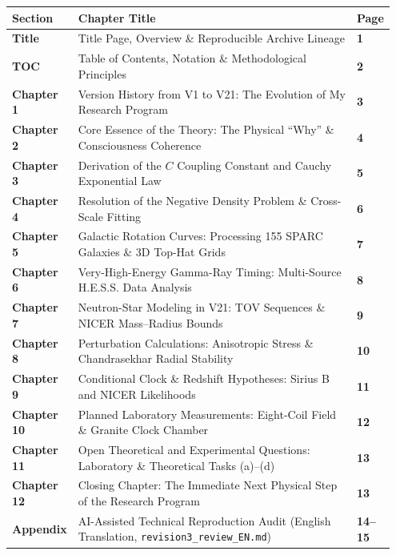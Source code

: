\documentclass[10pt,a4paper]{article}
\begin{document}
\par\vspace{1pt}
{\footnotesize
\begin{tabular}{@{}>{\raggedright\arraybackslash\bfseries\leavevmode\color{navy}}p{0.12\linewidth}>{\raggedright\arraybackslash}p{0.75\linewidth}>{\raggedleft\arraybackslash\bfseries}p{0.08\linewidth}@{}}
\toprule
Section & Chapter Title & Page \\
\midrule
Title & Title Page, Overview \& Reproducible Archive Lineage & 1 \\
TOC & Table of Contents, Notation \& Methodological Principles & 2 \\
Chapter 1 & Version History from V1 to V21: The Evolution of My Research Program & 3 \\
Chapter 2 & Core Essence of the Theory: The Physical ``Why'' \& Consciousness Coherence & 4 \\
Chapter 3 & Derivation of the $C$ Coupling Constant and Cauchy Exponential Law & 5 \\
Chapter 4 & Resolution of the Negative Density Problem \& Cross-Scale Fitting & 6 \\
Chapter 5 & Galactic Rotation Curves: Processing 155 SPARC Galaxies \& 3D Top-Hat Grids & 7 \\
Chapter 6 & Very-High-Energy Gamma-Ray Timing: Multi-Source H.E.S.S. Data Analysis & 8 \\
Chapter 7 & Neutron-Star Modeling in V21: TOV Sequences \& NICER Mass--Radius Bounds & 9 \\
Chapter 8 & Perturbation Calculations: Anisotropic Stress \& Chandrasekhar Radial Stability & 10 \\
Chapter 9 & Conditional Clock \& Redshift Hypotheses: Sirius B and NICER Likelihoods & 11 \\
Chapter 10 & Planned Laboratory Measurements: Eight-Coil Field \& Granite Clock Chamber & 12 \\
Chapter 11 & Open Theoretical and Experimental Questions: Laboratory \& Theoretical Tasks (a)--(d) & 13 \\
Chapter 12 & Closing Chapter: The Immediate Next Physical Step of the Research Program & 13 \\
Appendix & AI-Assisted Technical Reproduction Audit (English Translation, \texttt{revision3\_review\_EN.md}) & 14--15 \\
\bottomrule
\end{tabular}}
\end{document}
